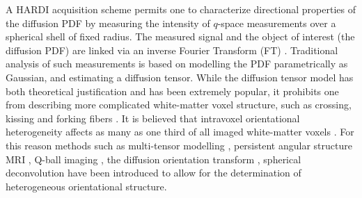 \documentclass[dvips,aoas,preprint]{imsart}
\numberwithin{equation}{section}
\theoremstyle{plain}
\begin{document}

A HARDI acquisition scheme permits one to characterize directional
properties of the diffusion PDF by measuring the intensity of
$q$-space measurements over a spherical shell of fixed radius.  The
measured signal and the object of interest (the diffusion PDF) are
linked via an inverse Fourier Transform (FT)
\citep{Callaghan}.  Traditional analysis of such measurements is based
on modelling the PDF parametrically as Gaussian, and estimating a
diffusion tensor.  While the diffusion tensor model has both
theoretical justification and has been extremely popular, it prohibits
one from describing more complicated white-matter voxel structure,
such as crossing, kissing and forking fibers
\citep{mor-zij:fiber-tracking}.  It is believed that intravoxel
orientational heterogeneity affects as many as one third of all imaged
white-matter voxels \citep{Behrens2007}.  For this reason
methods such as multi-tensor modelling \citep{Alexander2005},
persistent angular structure MRI \citep{Jansons}, Q-ball imaging
\citep{Tuch}, the diffusion orientation transform
\citep{Ozarslan2006}, spherical deconvolution \citep{Tournier}
have been introduced to allow for the determination of heterogeneous
orientational structure.
\end{document}
